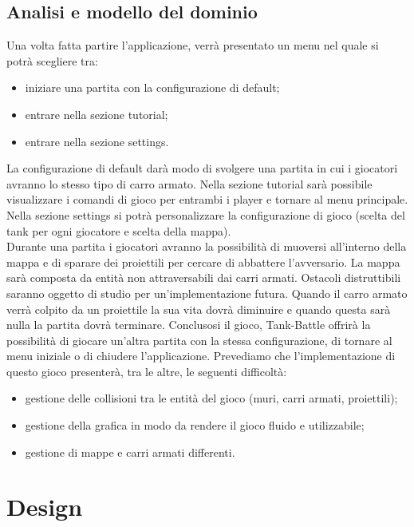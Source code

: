 \documentclass[a4paper,12pt]{report}
\begin{document}
\section{Analisi e modello del dominio}
Una volta fatta partire l’applicazione, verrà presentato un menu nel quale si potrà scegliere tra:
\begin{itemize}
	\item iniziare una partita con la configurazione di default;
	\item entrare nella sezione tutorial;
	\item entrare nella sezione settings.
\end{itemize}
La configurazione di default darà modo di svolgere una partita in cui i giocatori avranno lo stesso tipo di carro armato. Nella sezione tutorial sarà possibile visualizzare i comandi di gioco per entrambi i player e tornare al menu principale.
Nella sezione settings si potrà personalizzare la configurazione di gioco (scelta del tank per ogni giocatore e scelta della mappa).\\
Durante una partita i giocatori avranno la possibilità di muoversi all’interno della mappa e di sparare dei proiettili per cercare di abbattere l’avversario.
La mappa sarà composta da entità non attraversabili dai carri armati.
Ostacoli distruttibili saranno oggetto di studio per un’implementazione futura.
Quando il carro armato verrà colpito da un proiettile la sua vita dovrà diminuire e quando questa sarà nulla la partita dovrà terminare.
Conclusosi il gioco, Tank-Battle offrirà la possibilità di giocare un’altra partita con la stessa configurazione, di tornare al menu iniziale o di chiudere l’applicazione.
Prevediamo che l’implementazione di questo gioco presenterà, tra le altre, le seguenti difficoltà:
\begin{itemize}
	\item gestione delle collisioni tra le entità del gioco (muri, carri armati, proiettili);
	\item gestione della grafica in modo da rendere il gioco fluido e utilizzabile;
	\item gestione di mappe e carri armati differenti.
\end{itemize}
%
\chapter{Design}
\end{document}
